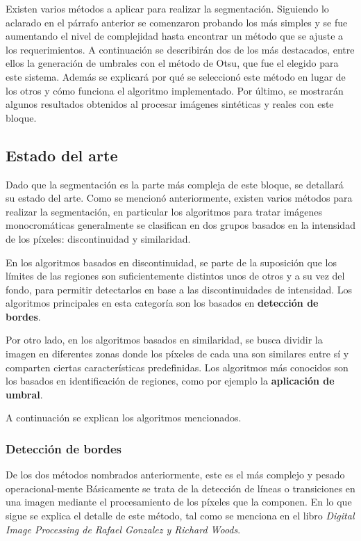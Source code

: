 Existen varios métodos a aplicar para realizar la segmentación. Siguiendo lo aclarado en el párrafo anterior se comenzaron probando los más simples y se fue aumentando el nivel de complejidad hasta encontrar un método que se ajuste a los requerimientos. A continuación se describirán dos de los más destacados, entre ellos la generación de umbrales con el método de Otsu\cite{otsu}, que fue el elegido para este sistema. Además se explicará por qué se seleccionó este método en lugar de los otros y cómo funciona el algoritmo implementado. Por último, se mostrarán algunos resultados obtenidos al procesar imágenes sintéticas y reales con este bloque.

\subsection{Estado del arte}%
\label{segEstArt}

Dado que la segmentación es la parte más compleja de este bloque, se detallará su estado del arte. Como se mencionó anteriormente, existen varios métodos para realizar la segmentación, en particular los algoritmos para tratar imágenes monocromáticas generalmente se clasifican en dos grupos basados en la intensidad de los píxeles: discontinuidad y similaridad. 

En los algoritmos basados en discontinuidad, se parte de la suposición que los límites de las regiones son suficientemente distintos unos de otros y a su vez del fondo, para permitir detectarlos en base a las discontinuidades de intensidad. Los algoritmos principales en esta categoría son los basados en \textbf{detección de bordes}.

Por otro lado, en los algoritmos basados en similaridad, se busca dividir la imagen en diferentes zonas donde los píxeles de cada una son similares entre sí y comparten ciertas características predefinidas. Los algoritmos más conocidos son los basados en identificación de regiones, como por ejemplo la \textbf{aplicación de umbral}.

A continuación se explican los algoritmos mencionados.

\subsubsection{Detección de bordes}
\label{detecbordeSec}

De los dos métodos nombrados anteriormente, este es el más complejo y pesado operacional-mente Básicamente se trata de la detección de líneas o transiciones en una imagen mediante el procesamiento de los píxeles que la componen. En lo que sigue se explica el detalle de este método, tal como se menciona en el libro \textit{Digital Image Processing de Rafael Gonzalez y Richard Woods}\cite{Gonzalez}.

